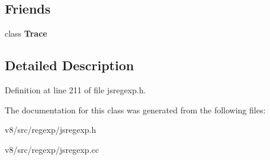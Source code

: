 \subsection*{Friends}
\begin{DoxyCompactItemize}
\item 
\mbox{\label{classv8_1_1internal_1_1OutSet_a9a7aa541dbcfdac34b25b49217ec39d7}} 
class {\bfseries Trace}
\end{DoxyCompactItemize}


\subsection{Detailed Description}


Definition at line 211 of file jsregexp.\+h.



The documentation for this class was generated from the following files\+:\begin{DoxyCompactItemize}
\item 
v8/src/regexp/jsregexp.\+h\item 
v8/src/regexp/jsregexp.\+cc\end{DoxyCompactItemize}

